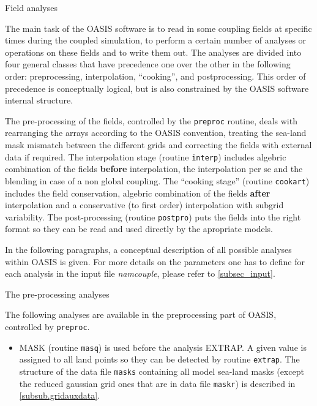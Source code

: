 \begin{subsection}{Field analyses}
\label{subsec_analyses}

The main task of the OASIS software is to read in some coupling fields at
specific times during the coupled simulation, to perform a certain
number of analyses or operations on these fields and to write them
out. The analyses are divided into four general classes that have
precedence one over the other in the following order: preprocessing, 
interpolation, ``cooking'', and postprocessing. This order of
precedence is conceptually logical, but is also constrained by the 
OASIS software internal structure.

\vspace{0.4cm}

The pre-processing of the fields, controlled by the {\tt preproc}
routine, deals with rearranging the arrays according to the OASIS 
convention, treating the sea-land mask mismatch between the different 
grids and correcting the fields with external data if required.
The interpolation stage (routine {\tt interp})
includes algebric combination of the fields {\bf before }
interpolation, the interpolation per se and the blending in case of a non
global coupling. The ``cooking stage'' (routine {\tt cookart}) includes
the field conservation, algebric combination of the fields {\bf after}
interpolation and a conservative (to first order) interpolation with 
subgrid variability. The post-processing (routine {\tt postpro}) puts 
the fields into the right format so they can be
read and used directly by the apropriate models.

\vspace{0.4cm}

In the following paragraphs, a conceptual description of all 
possible analyses within OASIS is given. For more details on the
parameters one has to define for each analysis in the input file {\em
namcouple}, please refer to \ref{subsec_input}.

\begin{subsubsection}{The pre-processing analyses}
\label{subsubsec_preproc}

The following analyses are available in the preprocessing part of
OASIS, controlled by {\tt preproc}.

\begin{itemize}
    
\item MASK (routine {\tt masq}) is used before the analysis EXTRAP. 
A given value is assigned to all land points so they can be detected 
by routine {\tt extrap}. The structure of the data file {\tt masks}
containing all model sea-land masks (except the reduced gaussian grid
ones that are in data file {\tt maskr}) is described in 
\ref{subsub.gridauxdata}.


\end{itemize}
\end{subsubsection}
\end{subsection}
